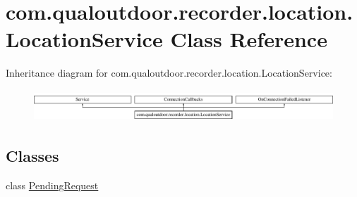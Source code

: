 \hypertarget{classcom_1_1qualoutdoor_1_1recorder_1_1location_1_1LocationService}{\section{com.\-qualoutdoor.\-recorder.\-location.\-Location\-Service Class Reference}
\label{classcom_1_1qualoutdoor_1_1recorder_1_1location_1_1LocationService}
}
Inheritance diagram for com.\-qualoutdoor.\-recorder.\-location.\-Location\-Service\-:\begin{figure}[H]
\begin{center}
\leavevmode
\includegraphics[height=1.200429cm]{classcom_1_1qualoutdoor_1_1recorder_1_1location_1_1LocationService}
\end{center}
\end{figure}
\subsection*{Classes}
\begin{DoxyCompactItemize}
\item 
class \hyperlink{classcom_1_1qualoutdoor_1_1recorder_1_1location_1_1LocationService_1_1PendingRequest}{Pending\-Request}
\end{DoxyCompactItemize}
